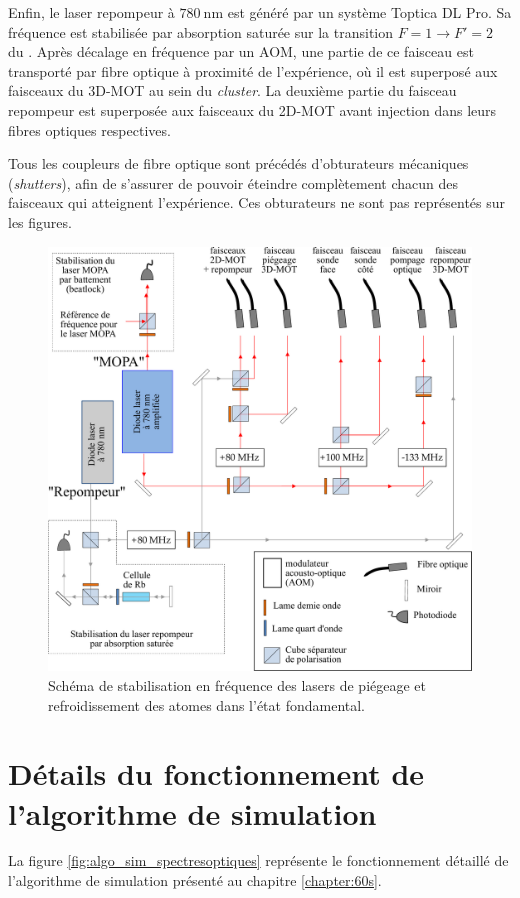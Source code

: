 Enfin, le laser \og repompeur \fg{} à $\SI{780}{\nano\meter}$ est généré par un système Toptica DL Pro.
Sa fréquence est stabilisée par absorption saturée sur la transition $F=1 \rightarrow F'=2$ du .
Après décalage en fréquence par un AOM, une partie de ce faisceau est transporté par fibre optique à proximité de l'expérience, où il est superposé aux faisceaux du 3D-MOT au sein du \textit{cluster}.
La deuxième partie du faisceau repompeur est superposée aux faisceaux du 2D-MOT avant injection dans leurs fibres optiques respectives.

Tous les coupleurs de fibre optique sont précédés d'obturateurs mécaniques (\textit{shutters}), afin de s'assurer de pouvoir \og éteindre \fg{} complètement chacun des faisceaux qui atteignent l'expérience.
Ces obturateurs ne sont pas représentés sur les figures.

\begin{figure}[h]
\centering
\includegraphics[width=\linewidth]{figures/apx/stabil_laser_2}
\caption[Schéma de stabilisation en fréquence des lasers de piégeage et refroidissement]
{
Schéma de stabilisation en fréquence des lasers de piégeage et refroidissement des atomes dans l'état fondamental.
}
\label{fig:laserlock2}
\end{figure}

\chapter{Détails du fonctionnement de l'algorithme de simulation}\label{app:algo}
\noindent La figure \eqref{fig:algo_sim_spectresoptiques} représente le fonctionnement détaillé de l'algorithme de simulation présenté au chapitre \ref{chapter:60s}.

